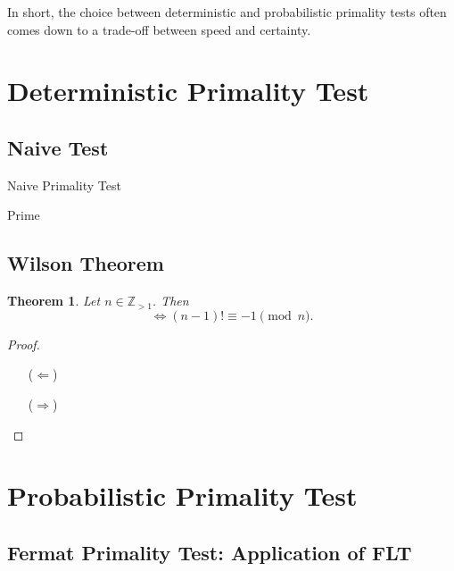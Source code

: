 \documentclass[12pt,openany]{book}
\DeclarePairedDelimiter{\floor}{\lfloor}{\rfloor}
\newtheorem{theorem}{Theorem}[chapter]
\theoremstyle{definition}
\newcommand{\Z}{\mathbb{Z}}
\begin{document}
	In short, the choice between deterministic and probabilistic primality tests often comes down to a trade-off between speed and certainty.
	
	\newpage
	\section{Deterministic Primality Test}
	\subsection{Naive Test}
	
	\begin{algorithm}[H]
		\caption{Naive Primality Test}
		\KwData{$n\in\Z_{>1}$}
		\BlankLine
		\Return Prime\;
	\end{algorithm}
	
	\subsection{Wilson Theorem}
	
	
	\begin{tcolorbox}[colback=white,colframe=thmcolor,arc=5pt,title={\color{white}\bf Wilson Theorem}]
		\begin{theorem}
			Let $n\in\Z_{>1}$. Then \[
			\iff (n-1)!\equiv -1\pmod{n}.
			\]
		\end{theorem}
	\end{tcolorbox}
	\begin{proof}
		\begin{itemize}
			\item[($\Leftarrow$)]
			\item[($\Rightarrow$)]
		\end{itemize}
	\end{proof}
	
	\newpage
	\section{Probabilistic Primality Test}
	\subsection{Fermat Primality Test: Application of FLT}
	
\end{document}
